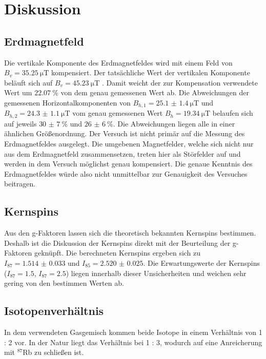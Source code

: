 \section{Diskussion}
\label{sec:Diskussion}

\subsection{Erdmagnetfeld}
Die vertikale Komponente des Erdmagnetfeldes wird mit einem Feld von $B_v=\SI{35.25}{\micro\tesla}$ kompensiert. 
Der tatsächliche Wert der vertikalen Komponente beläuft sich auf $B_v=\SI{45.23}{\micro\tesla}$ \cite{mag_DO_2}.
Damit weicht der zur Kompensation verwendete Wert um $\SI{22.07}{\percent}$ von dem genau gemessenen Wert ab.
Die Abweichungen der gemessenen Horizontalkomponenten von $B_{h,1} = \SI{25.1(14)}{\micro\tesla}$ und $B_{h,2} = \SI{24.3(11)}{\micro\tesla}$
vom genau gemessenen Wert $B_h=\SI{19.34}{\micro\tesla}$ belaufen sich auf jeweils $\SI{30(7)}{\percent}$ und $\SI{26(6)}{\percent}$. 
Die Abweichungen liegen alle in einer ähnlichen Größenordnung. 
Der Versuch ist nicht primär auf die Messung des Erdmagnetfeldes ausgelegt. 
Die umgebenen Magnetfelder, welche sich nicht nur aus dem Erdmagnetfeld zusammensetzen, treten hier als Störfelder auf und werden in dem Versuch möglichst genau kompensiert.
Die genaue Kenntnis des Erdmagnetfeldes würde also nicht unmittelbar zur Genauigkeit des Versuches beitragen. 


\subsection{Kernspins}

Aus den g-Faktoren lassen sich die theoretisch bekannten Kernspins bestimmen. 
Deshalb ist die Diskussion der Kernspins direkt mit der Beurteilung der g-Faktoren geknüpft.
Die berechneten Kernspins ergeben sich zu $ I_{87} = \num{1.514(33)}$ und $I_{85} = \num{2.520(25)}$.
Die Erwartungswerte der Kernspins ($ I_{87} = \num{1.5}$, $ I_{87} = \num{2.5}$) liegen innerhalb dieser Unsicherheiten und weichen sehr gering von den bestimmen Werten ab.


\subsection{Isotopenverhältnis}
In dem verwendeten Gasgemisch kommen beide Isotope in einem Verhältnis von 1 : 2 vor. In der Natur liegt das Verhältnis bei 1 : 3, wodurch auf eine Anreicherung mit $^{87}$Rb zu schließen ist. 


